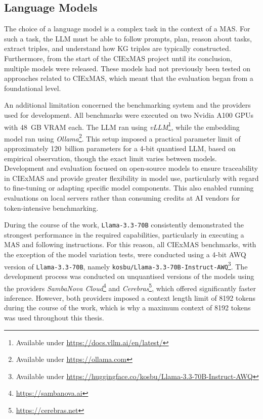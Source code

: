 \documentclass[a4paper,oneside,bibliography=totoc]{scrbook}
\begin{document}
\subsection{Language Models}
\label{subsec:eval_language_models}

The choice of a language model is a complex task in the context of a \ac{MAS}. For such a task, the \ac{LLM} must be able to follow prompts, plan, reason about tasks, extract triples, and understand how \ac{KG} triples are typically constructed. Furthermore, from the start of the CIExMAS project until its conclusion, multiple models were released. These models had not previously been tested on approaches related to CIExMAS, which meant that the evaluation began from a foundational level.

An additional limitation concerned the benchmarking system and the providers used for development. All benchmarks were executed on two Nvidia A100 GPUs with 48~GB VRAM each. The \ac{LLM} ran using \textit{vLLM}\footnote{Available under \url{https://docs.vllm.ai/en/latest/}}, while the embedding model ran using \textit{Ollama}\footnote{Available under \url{https://ollama.com}}. This setup imposed a practical parameter limit of approximately 120~billion parameters for a 4-bit quantised \ac{LLM}, based on empirical observation, though the exact limit varies between models. Development and evaluation focused on open-source models to ensure traceability in CIExMAS and provide greater flexibility in model use, particularly with regard to fine-tuning or adapting specific model components. This also enabled running evaluations on local servers rather than consuming credits at AI vendors for token-intensive benchmarking.

During the course of the work, \texttt{Llama-3.3-70B} consistently demonstrated the strongest performance in the required capabilities, particularly in executing a \ac{MAS} and following instructions. For this reason, all CIExMAS benchmarks, with the exception of the model variation tests, were conducted using a 4-bit AWQ version of \texttt{Llama-3.3-70B}, namely \texttt{kosbu/Llama-3.3-70B-Instruct-AWQ}\footnote{Available under \url{https://huggingface.co/kosbu/Llama-3.3-70B-Instruct-AWQ}}. The development process was conducted on unquantised versions of the models using the providers \textit{SambaNova Cloud}\footnote{\url{https://sambanova.ai}} and \textit{Cerebras}\footnote{\url{https://cerebras.net}}, which offered significantly faster inference. However, both providers imposed a context length limit of 8192 tokens during the course of the work, which is why a maximum context of 8192 tokens was used throughout this thesis.
\end{document}

